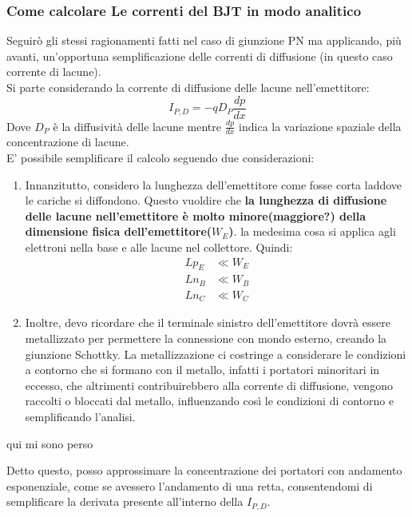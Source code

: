 \subsubsection{Come calcolare Le correnti del BJT  in modo analitico}
Seguirò gli stessi ragionamenti fatti nel caso di giunzione PN ma applicando, più avanti, un'opportuna semplificazione delle correnti di diffusione (in questo caso corrente di lacune).\\
Si parte considerando la corrente di diffusione delle lacune nell'emettitore:
\begin{equation}
    I_{P,D}=-qD_P\dfrac{dp}{dx}
\end{equation}
Dove $D_P$ è la diffusività delle lacune mentre $\frac{dp}{dx}$ indica la variazione spaziale della concentrazione di lacune.\\
E' possibile semplificare il calcolo seguendo due considerazioni:\\
\begin{enumerate}
    \item Innanzitutto, considero la lunghezza dell'emettitore come fosse corta laddove le cariche si diffondono. Questo vuoldire che \textbf{la lunghezza di diffusione delle lacune nell'emettitore è molto minore(maggiore?) della dimensione fisica dell'emettitore($W_E$)}.
la medesima cosa si applica agli elettroni nella base e alle lacune nel collettore. Quindi:
\begin{align}
    Lp_{E} & \ll W_E\\
    Ln_B &\ll W_B \\
    Ln_C &\ll W_C
\end{align}
\item Inoltre, devo ricordare che il terminale sinistro dell'emettitore dovrà essere metallizzato per permettere la connessione con mondo esterno, creando la giunzione Schottky.
La metallizzazione ci costringe a considerare le condizioni a contorno che si formano con il metallo, infatti i portatori minoritari in eccesso, che altrimenti contribuirebbero alla corrente di diffusione, vengono raccolti o bloccati dal metallo, influenzando così le condizioni di contorno e semplificando l'analisi.\\
%
\end{enumerate}


\begin{ricevimento}
    qui mi sono perso
\end{ricevimento}
Detto questo, posso approssimare la concentrazione dei portatori con andamento esponenziale, come se  avessero l'andamento di una retta, consentendomi di semplificare la derivata presente all'interno della $I_{P,D}$.



